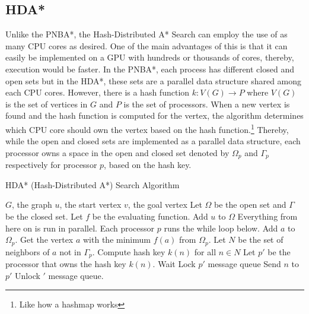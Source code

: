 \subsection{HDA*}
Unlike the PNBA*, the Hash-Distributed A* Search can employ the use of as many CPU cores as desired.\cite{Kishimoto2009} One 
of the main advantages of this is that it can easily be implemented on a GPU with hundreds or thousands of cores, thereby, 
execution would be faster. In the PNBA*, each process has different closed and open sets but in the HDA*, 
these sets are a parallel data structure shared among each CPU cores. However, there is a hash function $k:V(G)\to P$ where 
$V(G)$ is the set of vertices in $G$ and $P$ is the set of processors. When a new vertex is found and the hash function is computed for 
the vertex, the algorithm determines which CPU core should own the vertex based on the hash function.\footnote{Like how a hashmap works}
Thereby, while the open and closed sets are implemented as a parallel data structure, each processor owns a space 
in the open and closed set denoted by $\Omega_p$ and $\Gamma_p$ respectively for processor $p$, based on the hash key.

\begin{algorithm}[H]
    \caption{HDA* (Hash-Distributed A*) Search Algorithm}
    \begin{algorithmic}
        \REQUIRE $G$, the graph 
        \REQUIRE $u$, the start vertex 
        \REQUIRE $v$, the goal vertex
        \STATE Let $\Omega$ be the open set and $\Gamma$ be the closed set. Let $f$ be the evaluating function.
        \STATE Add $u$ to $\Omega$
        \STATE Everything from here on is run in parallel. Each processor $p$ runs the while loop below.
                    \STATE Add $a$ to $\Omega_p$.
                \ENDIF
            \ELSE
                \STATE Get the vertex $a$ with the minimum $f(a)$ from $\Omega_p$.
                \STATE Let $N$ be the set of neighbors of $a$ not in $\Gamma_p$.
                \STATE Compute hash key $k(n)$ for all $n\in N$
                \STATE Let $p'$ be the processor that owns the hash key $k(n)$.
                    \STATE Wait
                \ENDWHILE
                \STATE Lock $p'$ message queue
                \STATE Send $n$ to $p'$
                \STATE Unlock $'$ message queue.       
            \ENDIF
        \ENDWHILE
    \end{algorithmic}
\end{algorithm}

